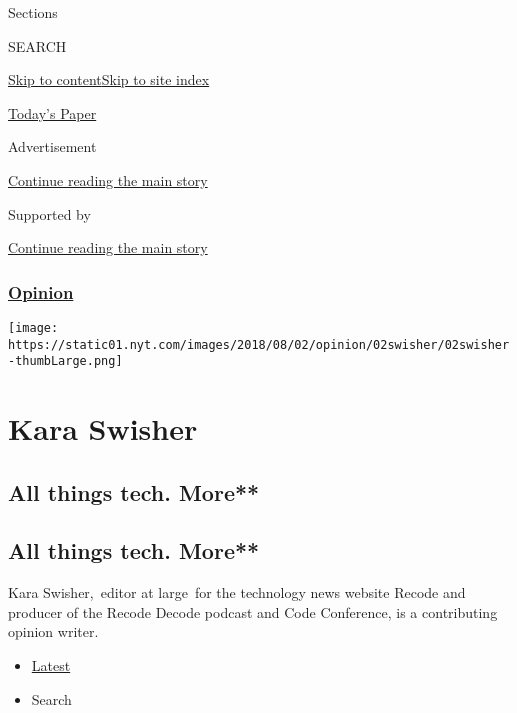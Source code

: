 Sections

SEARCH

\protect\hyperlink{site-content}{Skip to
content}\protect\hyperlink{site-index}{Skip to site index}

\href{https://myaccount.nytimes.com/auth/login?response_type=cookie\&client_id=vi}{}

\href{https://www.nytimes.com/section/todayspaper}{Today's Paper}

Advertisement

\protect\hyperlink{after-top}{Continue reading the main story}

Supported by

\protect\hyperlink{after-sponsor}{Continue reading the main story}

\hypertarget{opinion}{%
\subsubsection{\texorpdfstring{\href{/section/opinion}{Opinion}}{Opinion}}\label{opinion}}

\texttt{[image: https://static01.nyt.com/images/2018/08/02/opinion/02swisher/02swisher-thumbLarge.png]}

\hypertarget{kara-swisher}{%
\section{Kara Swisher}\label{kara-swisher}}

\hypertarget{all-things-tech-more}{%
\subsection{All things tech. More**}\label{all-things-tech-more}}

\hypertarget{all-things-tech-more-1}{%
\subsection{All things tech. More**}\label{all-things-tech-more-1}}

Kara Swisher,~editor at large~for the technology news website Recode and
producer of the Recode Decode podcast and Code Conference, is a
contributing opinion writer.

\begin{itemize}
\tightlist
\item
  \protect\hyperlink{stream-panel}{Latest}
\item
  Search
\end{itemize}


